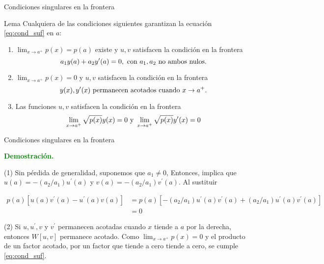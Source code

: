\documentclass[xcolor=dvipsnames,a4paper,10pt,handout]{beamer}
\renewcommand{\textbf}[1]{\textcolor{green}{\bfseries #1}}
\begin{document}
 
  
\begin{frame}{Condiciones singulares en la frontera}



\begin{block}{Lema} Cualquiera de las  condiciones siguientes garantizan la ecuación \eqref{eq:cond_suf} en $a$:
    \begin{enumerate}
        \item<+-> $\lim _{x \rightarrow a^{+}} p(x)=p(a)$ existe y $u, v$ satisfacen la condición en la frontera
            \begin{equation}\label{eq:con_cont_1}
            a_{1} y(a)+a_{2} y^{\prime}(a)=0,\hbox{ con  }a_{1}, a_{2} \hbox{ no ambos nulos.}
            \end{equation}

        \item<+->$\lim_{x\to a^+}p(x)=0$ y $u, v$ satisfacen la condición en la frontera
            \begin{equation}\label{eq:con_cont_2}
                y(x), y^{\prime}(x) \hbox{ permanecen acotados cuando } x \rightarrow a^{+}.
            \end{equation} 
        \item<+-> Las funciones $u, v$ satisfacen la condición en la frontera
            \begin{equation}\label{eq:con_cont_3}
                \lim _{x \rightarrow a^{+}} \sqrt{p(x)} y(x)=0 \hbox{ y }\lim _{x \rightarrow a^{+}} \sqrt{p(x)} y^{\prime}(x)=0
            \end{equation}
       \end{enumerate}
\end{block}

\end{frame}



 
  
\begin{frame}{Condiciones singulares en la frontera}

\onslide<+->
\textbf{Demostración.}

(1) Sin pérdida de generalidad, suponemos que $a_{1} \neq 0$, Entonces,  implica que $u(a)=-\left(a_{2} / a_{1}\right) u^{\prime}(a)$ y $v(a)=-\left(a_{2} / a_{1}\right) v^{\prime}(a)$. Al sustituir

$$
\begin{aligned}
p(a)\left[u(a) v^{\prime}(a)-u^{\prime}(a) v(a)\right] &=p(a)\left[-\left(a_{2} / a_{1}\right) u^{\prime}(a) v^{\prime}(a)+\left(a_{2} / a_{1}\right) u^{\prime}(a) v^{\prime}(a)\right] \\
&=0
\end{aligned}
$$

\onslide<+->
(2)  Si $u, u^{\prime}, v$ y $ v^{\prime}$ permanecen acotadas cuando $x$ tiende a $a$ por la derecha, entonces  $W[u,v]$ permanece acotado. Como $\lim_{x \rightarrow a^{+}} p(x)=0$ y el producto de un factor acotado, por un factor que tiende a cero tiende a cero,  se cumple \eqref{eq:cond_suf}.

\end{frame}
\end{document}
